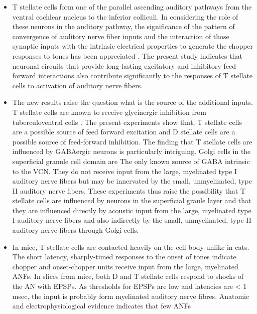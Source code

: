 \documentclass[10pt,a4paper]{article}
\begin{document}
\begin{itemize}
\item T stellate cells form one of the parallel ascending auditory pathways from
  the ventral cochlear nucleus to the inferior colliculi.  In considering the
  role of these neurons in the auditory pathway, the significance of the pattern
  of convergence of auditory nerve fiber inputs and the interaction of those
  synaptic inputs with the intrinsic electrical properties to generate the
  chopper responses to tones has been appreciated
  \citep{BanksSachs:1991,MolnarPfeiffer:1968;Oertel:1983,WangSachs:1995,WhiteYoungEtAl:1994,WuOertel:1984}
  . The present study indicates that neuronal circuits that provide long-lasting
  excitatory and inhibitory feed-forward interactions also contribute
  significantly to the responses of T stellate cells to activation of auditory
  nerve fibers.
\item The new results raise the question what is the source of the additional
  inputs. T stellate cells are known to receive glycinergic inhibition from
  tuberculoventral cells \citep{WickesbergOertel:1990} .  The present
  experiments show that, T stellate cells are a possible source of feed forward
  excitation and D stellate cells are a possible source of feed-forward
  inhibition. The finding that T stellate cells are influenced by GABAergic
  neurons is particularly intriguing. Golgi cells in the superficial granule
  cell domain are The only known source of GABA intrinsic to the VCN. They do
  not receive input from the large, myelinated type I auditory nerve fibers but
  may be innervated by the small, unmyelinated, type II auditory nerve fibers.
  These experiments thus raise the possibility that T stellate cells are
  influenced by neurons in the superficial graule layer and that they are
  influenced directly by acoustic input from the large, myelinated type I
  auditory nerve fibers and also indirectly by the small, unmyelinated, type II
  auditory nerve fibers through Golgi cells.
\item In mice, T stellate cells are contacted heavily on the cell body unlike in
  cats.  The short latency, sharply-timed responses to the onset of tones
  indicate chopper and onset-chopper units receive input from the large,
  myelinated ANFs.  In slices from mice, both D and T stellate cells respond to
  shocks of the AN with EPSPs.  As thresholds for EPSPs are low and latencies
  are {\textless} 1 msec, the input is probably form myelinated auditory nerve
  fibres.  Anatomic and electrophysiological evidence indicates that few ANFs

\end{itemize}
\end{document}
